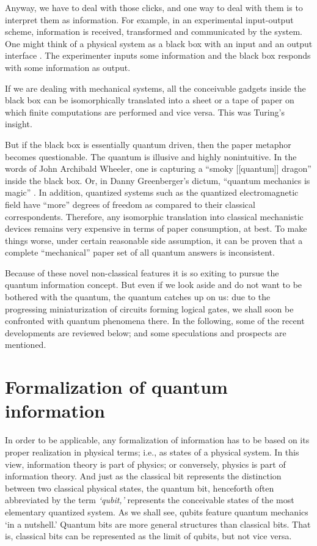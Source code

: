 \documentclass [11pt]{llncs}
\begin{document}
Anyway, we have to deal with those clicks,
and one way to deal with them is to interpret them as information.
For example, in  an experimental  input-output scheme, information is received, transformed and communicated by the system.
One might think of a physical system as a black box with an input and an
output interface \cite{svozil-2000interface}.
The experimenter inputs some information and the black box responds with some information as output.

If we are dealing with mechanical systems, all the conceivable  gadgets inside the black box
can be isomorphically translated into a sheet or a tape of
paper on which finite computations are performed and vice versa.
This was  Turing's insight.

But if the black box is essentially quantum driven, then the paper metaphor becomes questionable.
The quantum is illusive and highly nonintuitive.
In the words of John Archibald Wheeler,
one is capturing a ``smoky [[quantum]] dragon'' \cite{wheeler} inside the black box.
Or, in Danny Greenberger's dictum, ``quantum mechanics is magic'' \cite{greenberger:pr2}.
In addition, quantized systems such as the quantized electromagnetic
field have ``more'' degrees of freedom
as compared to their classical correspondents.
Therefore, any isomorphic translation into
classical mechanistic devices remains very expensive in terms of paper consumption, at best.
To make things worse, under certain reasonable side assumption, it can be proven that a complete
``mechanical'' paper set of all quantum answers is inconsistent.

Because of these novel non-classical features
it is so exiting to pursue the quantum information concept.
But even if we look aside and do not want to be bothered with the quantum,
the quantum catches up on us: due to the progressing miniaturization of
circuits forming logical gates, we shall soon be confronted with
quantum phenomena there.
In the following, some of the recent developments are reviewed below;
and some speculations and prospects are mentioned.


\section{Formalization of quantum information}

In order to be applicable, any formalization of information has to be based on its proper realization
in physical terms; i.e., as states of a physical system.
In this view, information theory is part of physics; or conversely, physics is part of information theory.
And just as the classical bit represents the distinction between two classical physical states,
the quantum bit, henceforth often
abbreviated by the term {\em`qubit,'} represents the conceivable states of the most
elementary quantized system.
As we shall see, qubits feature quantum
mechanics `in a nutshell.'
Quantum bits are more general structures than classical bits.
That is,  classical bits can be represented as the limit of qubits, but not vice versa.
\end{document}
